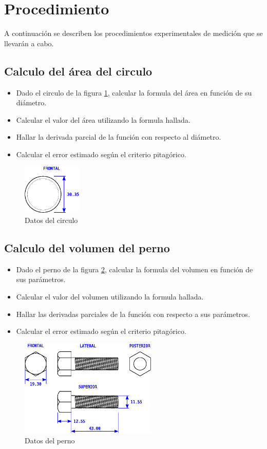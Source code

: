 \documentclass[letter,11pt]{article}
\begin{document}
\section{Procedimiento}
A continuación se describen los procedimientos experimentales de medición que se
llevarán a cabo.

\subsection{Calculo del área del circulo}
\begin{itemize}
\item Dado el circulo de la figura \ref{circulo}, calcular la formula del
área en función de su diámetro.
\item Calcular el valor del área utilizando la formula hallada.
\item Hallar la derivada parcial de la función con respecto al diámetro.
\item Calcular el error estimado según el criterio pitagórico.
\end{itemize}

\begin{figure}
\centering
\includegraphics[width=0.25\textwidth]{resources/2.1.circulo.eps}
\caption{Datos del circulo}
\label{circulo}
\end{figure}

\subsection{Calculo del volumen del perno}
\begin{itemize}
\item Dado el perno de la figura \ref{perno}, calcular la formula del
volumen en función de sus parámetros.
\item Calcular el valor del volumen utilizando la formula hallada.
\item Hallar las derivadas parciales de la función con respecto a sus
parámetros.
\item Calcular el error estimado según el criterio pitagórico.
\end{itemize}

\begin{figure}
\centering
\includegraphics[width=0.58\textwidth]{resources/2.2.perno.eps}
\caption{Datos del perno}
\label{perno}
\end{figure}
\end{document}
